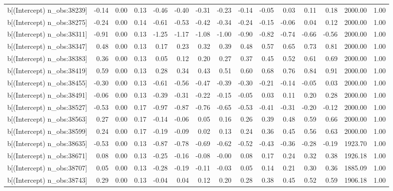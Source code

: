 \begin{table}[ht]
\begin{tabular}{rrrrrrrrrrrrrrr}
  b[(Intercept) n\_obs:38239] & -0.14 & 0.00 & 0.13 & -0.46 & -0.40 & -0.31 & -0.23 & -0.14 & -0.05 & 0.03 & 0.11 & 0.18 & 2000.00 & 1.00 \\ 
  b[(Intercept) n\_obs:38275] & -0.24 & 0.00 & 0.14 & -0.61 & -0.53 & -0.42 & -0.34 & -0.24 & -0.15 & -0.06 & 0.04 & 0.12 & 2000.00 & 1.00 \\ 
  b[(Intercept) n\_obs:38311] & -0.91 & 0.00 & 0.13 & -1.25 & -1.17 & -1.08 & -1.00 & -0.90 & -0.82 & -0.74 & -0.66 & -0.56 & 2000.00 & 1.00 \\ 
  b[(Intercept) n\_obs:38347] & 0.48 & 0.00 & 0.13 & 0.17 & 0.23 & 0.32 & 0.39 & 0.48 & 0.57 & 0.65 & 0.73 & 0.81 & 2000.00 & 1.00 \\ 
  b[(Intercept) n\_obs:38383] & 0.36 & 0.00 & 0.13 & 0.05 & 0.12 & 0.20 & 0.27 & 0.37 & 0.45 & 0.52 & 0.61 & 0.69 & 2000.00 & 1.00 \\ 
  b[(Intercept) n\_obs:38419] & 0.59 & 0.00 & 0.13 & 0.28 & 0.34 & 0.43 & 0.51 & 0.60 & 0.68 & 0.76 & 0.84 & 0.91 & 2000.00 & 1.00 \\ 
  b[(Intercept) n\_obs:38455] & -0.30 & 0.00 & 0.13 & -0.61 & -0.56 & -0.47 & -0.39 & -0.30 & -0.21 & -0.14 & -0.05 & 0.03 & 2000.00 & 1.00 \\ 
  b[(Intercept) n\_obs:38491] & -0.06 & 0.00 & 0.13 & -0.39 & -0.31 & -0.22 & -0.15 & -0.05 & 0.03 & 0.11 & 0.20 & 0.28 & 2000.00 & 1.00 \\ 
  b[(Intercept) n\_obs:38527] & -0.53 & 0.00 & 0.17 & -0.97 & -0.87 & -0.76 & -0.65 & -0.53 & -0.41 & -0.31 & -0.20 & -0.12 & 2000.00 & 1.00 \\ 
  b[(Intercept) n\_obs:38563] & 0.27 & 0.00 & 0.17 & -0.14 & -0.06 & 0.05 & 0.16 & 0.26 & 0.39 & 0.48 & 0.59 & 0.66 & 2000.00 & 1.00 \\ 
  b[(Intercept) n\_obs:38599] & 0.24 & 0.00 & 0.17 & -0.19 & -0.09 & 0.02 & 0.13 & 0.24 & 0.36 & 0.45 & 0.56 & 0.63 & 2000.00 & 1.00 \\ 
  b[(Intercept) n\_obs:38635] & -0.53 & 0.00 & 0.13 & -0.87 & -0.78 & -0.69 & -0.62 & -0.52 & -0.43 & -0.36 & -0.28 & -0.19 & 1923.70 & 1.00 \\ 
  b[(Intercept) n\_obs:38671] & 0.08 & 0.00 & 0.13 & -0.25 & -0.16 & -0.08 & -0.00 & 0.08 & 0.17 & 0.24 & 0.32 & 0.38 & 1926.18 & 1.00 \\ 
  b[(Intercept) n\_obs:38707] & 0.05 & 0.00 & 0.13 & -0.28 & -0.19 & -0.11 & -0.03 & 0.05 & 0.14 & 0.21 & 0.30 & 0.36 & 1885.09 & 1.00 \\ 
  b[(Intercept) n\_obs:38743] & 0.29 & 0.00 & 0.13 & -0.04 & 0.04 & 0.12 & 0.20 & 0.28 & 0.38 & 0.45 & 0.52 & 0.59 & 1906.18 & 1.00 \\ 

\end{tabular}
\end{table}
